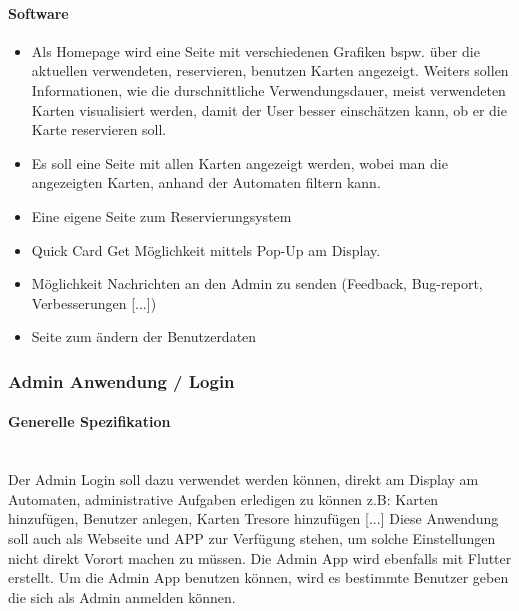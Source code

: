 \documentclass[a4paper]{article}
\begin{document}
\paragraph{Software}
\begin{itemize}
  \item Als Homepage wird eine Seite mit verschiedenen Grafiken bspw. über die aktuellen verwendeten, reservieren, benutzen Karten angezeigt. Weiters sollen Informationen, wie die durschnittliche Verwendungsdauer, meist verwendeten Karten visualisiert werden, damit der User besser einschätzen kann, ob er die Karte reservieren soll.
  \item Es soll eine Seite mit allen Karten angezeigt werden, wobei man die angezeigten Karten, anhand der Automaten filtern kann.
  \item Eine eigene Seite zum Reservierungsystem
  \item Quick Card Get Möglichkeit mittels Pop-Up am Display.
  \item Möglichkeit Nachrichten an den Admin zu senden (Feedback, Bug-report, Verbesserungen [...])
  \item Seite zum \"andern der Benutzerdaten
\end{itemize}



\subsubsection{Admin Anwendung / Login}
\paragraph{Generelle Spezifikation}\mbox{}\\
Der Admin Login soll dazu verwendet werden können, direkt am Display am Automaten, administrative Aufgaben erledigen zu können z.B: Karten hinzufügen, Benutzer anlegen, Karten Tresore hinzufügen [...] Diese Anwendung soll auch als Webseite und APP zur Verfügung stehen, um solche Einstellungen nicht direkt Vorort machen zu müssen. Die Admin App wird ebenfalls mit Flutter erstellt. Um die Admin App benutzen können, wird es bestimmte Benutzer geben die sich als Admin anmelden können. 
\end{document}
